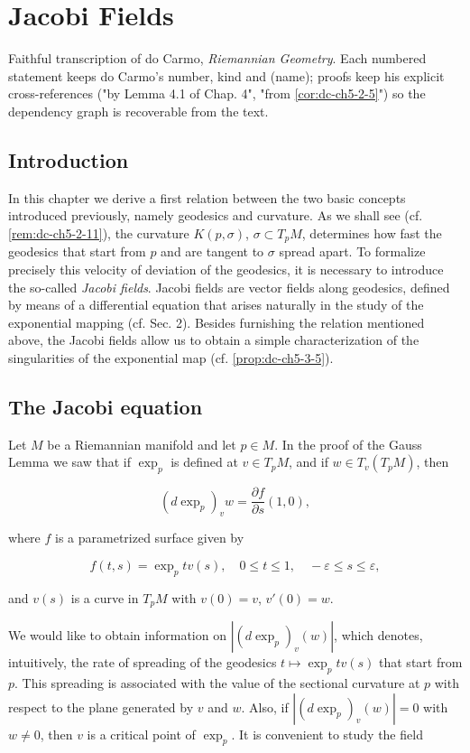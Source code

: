 \chapter{Jacobi Fields}
\label{chap:dc-jacobi-fields}

Faithful transcription of do Carmo, \emph{Riemannian Geometry}. Each numbered
statement keeps do Carmo's number, kind and (name); proofs keep his explicit
cross-references ("by Lemma 4.1 of Chap. 4", "from \cref{cor:dc-ch5-2-5}") so the
dependency graph is recoverable from the text.

\section{Introduction}

In this chapter we derive a first relation between the two basic concepts
introduced previously, namely geodesics and curvature. As we shall see (cf.
\cref{rem:dc-ch5-2-11}), the curvature $K(p,\sigma)$, $\sigma\subset T_p M$, determines how
fast the geodesics that start from $p$ and are tangent to $\sigma$ spread apart.
To formalize precisely this velocity of deviation of the geodesics, it is
necessary to introduce the so-called \emph{Jacobi fields}. Jacobi fields are vector
fields along geodesics, defined by means of a differential equation that arises
naturally in the study of the exponential mapping (cf. Sec. 2). Besides
furnishing the relation mentioned above, the Jacobi fields allow us to obtain a
simple characterization of the singularities of the exponential map (cf.
\cref{prop:dc-ch5-3-5}).

\section{The Jacobi equation}

Let $M$ be a Riemannian manifold and let $p\in M$. In the proof of the Gauss
Lemma we saw that if $\exp_p$ is defined at $v\in T_p M$, and if
$w\in T_v(T_p M)$, then

$$
(d\exp_p)_v w=\frac{\partial f}{\partial s}(1,0),
$$

where $f$ is a parametrized surface given by

$$
f(t,s)=\exp_p tv(s),\quad 0\le t\le 1,\quad -\varepsilon\le s\le\varepsilon,
$$

and $v(s)$ is a curve in $T_p M$ with $v(0)=v$, $v'(0)=w$.

We would like to obtain information on $|(d\exp_p)_v(w)|$, which denotes,
intuitively, the rate of spreading of the geodesics $t\mapsto\exp_p tv(s)$ that
start from $p$. This spreading is associated with the value of the sectional
curvature at $p$ with respect to the plane generated by $v$ and $w$. Also, if
$|(d\exp_p)_v(w)|=0$ with $w\neq 0$, then $v$ is a critical point of $\exp_p$. It
is convenient to study the field

